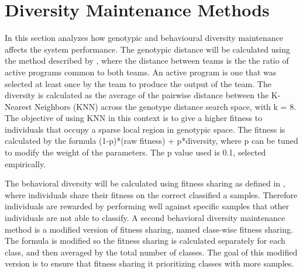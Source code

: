 \documentclass[journal]{IEEEtran}
\begin{document}
\section{Diversity Maintenance Methods}
In this section analyzes how genotypic and behavioural diversity maintenance affects the system performance. The genotypic distance will be calculated using the method described by \cite{ref3}, where the distance between teams is the the ratio of active programs common to both teams. An active program is one that was selected at least once by the team to produce the output of the team. The diversity is calculated as the average of the pairwise distance between the K-Nearest Neighbors (KNN) across the genotype distance search space, with k = 8. The objective of using KNN in this context is to give a higher fitness to individuals that occupy a sparse local region in genotypic space. The fitness is calculated by the formula (1-p)*(raw fitness) + p*diversity, where p can be tuned to modify the weight of the parameters. The p value used is 0.1, selected empirically.

The behavioral diversity will be calculated using fitness sharing as defined in \cite{ref4}, where individuals share their fitness on the correct classified a samples. Therefore individuals are rewarded by performing well against specific samples that other individuals are not able to classify. A second behavioral diversity maintenance method is a modified version of fitness sharing, named class-wise fitness sharing. The formula is modified so the fitness sharing is calculated separately for each class, and then averaged by the total number of classes. The goal of this modified version is to ensure that fitness sharing it prioritizing classes with more samples.
\end{document}
